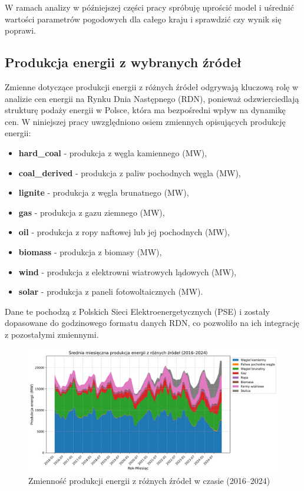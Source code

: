 W ramach analizy w późniejszej części pracy spróbuję uprościć model i uśrednić wartości parametrów pogodowych dla całego kraju i sprawdzić czy wynik się poprawi. 

\subsection{Produkcja energii z wybranych źródeł}
Zmienne dotyczące produkcji energii z różnych źródeł odgrywają kluczową rolę w analizie cen energii na Rynku Dnia Następnego (RDN), ponieważ odzwierciedlają strukturę podaży energii w Polsce, która ma bezpośredni wpływ na dynamikę cen. W niniejszej pracy uwzględniono osiem zmiennych opisujących produkcję energii: 
\begin{itemize}
    \item \textbf{hard\_coal} - produkcja z węgla kamiennego (MW),
    \item \textbf{coal\_derived} - produkcja z paliw pochodnych węgla (MW),
    \item \textbf{lignite} - produkcja z węgla brunatnego (MW),
    \item \textbf{gas} - produkcja z gazu ziemnego (MW),
    \item \textbf{oil} - produkcja z ropy naftowej lub jej pochodnych (MW),
    \item \textbf{biomass} - produkcja z biomasy (MW),
    \item \textbf{wind} - produkcja z elektrowni wiatrowych lądowych (MW),
    \item \textbf{solar} - produkcja z paneli fotowoltaicznych (MW).
\end{itemize}

Dane te pochodzą z Polskich Sieci Elektroenergetycznych (PSE) i zostały dopasowane do godzinowego formatu danych RDN, co pozwoliło na ich integrację z pozostałymi zmiennymi. 
\begin{figure}[H]
    \centering
    \includegraphics[width=1.05\textwidth]{../plots/energy/energy_production_time_series_full.png}
    \caption{Zmienność produkcji energii z różnych źródeł w czasie (2016–2024)}
    \label{fig:energy-production-time-series-full}
\end{figure}

